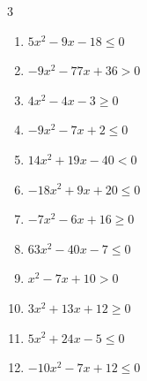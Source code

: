 \begin{multicols}{3}
\begin{enumerate}

  \item $5x^{2}-9x-18\leq 0$


  \item $-9x^{2}-77x+36>0$


  \item $4x^{2}-4x-3\geq 0$


  \item $-9x^{2}-7x+2\leq 0$


  \item $14x^{2}+19x-40<0$


\columnbreak %

  \item $-18x^{2}+9x+20\leq 0$


  \item $-7x^{2}-6x+16\geq 0$


  \item $63x^{2}-40x-7\leq 0$


  \item $x^{2}-7x+10>0$

        \phantom{$\displaystyle x < 2 , \; 5 < x$}

  \item $3x^{2}+13x+12\geq 0$


  \item $5x^{2}+24x-5\leq 0$


  \item $-10x^{2}-7x+12\leq 0$


\end{enumerate}
\end{multicols}
